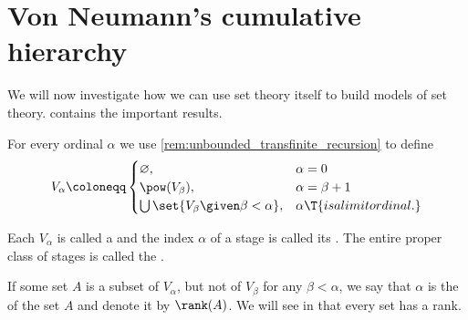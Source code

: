 \section{Von Neumann's cumulative hierarchy}\label{sec:von_neumanns_cumulative_hierarchy}

We will now investigate how we can use set theory itself to build models of set theory.  contains the important results.

\begin{definition}\label{def:cumulative_hierarchy}
  For every ordinal \( \alpha \) we use \cref{rem:unbounded_transfinite_recursion} to define
  \begin{equation}\label{eq:def:cumulative_hierarchy}
    V_\alpha \coloneqq \begin{cases}
      \varnothing,                                  &\alpha = 0 \\
      \pow(V_\beta),                                &\alpha = \beta + 1 \\
      \bigcup\set{ V_\beta \given \beta < \alpha }, &\alpha \T{is a limit ordinal.}
    \end{cases}
  \end{equation}

  Each \( V_\alpha \) is called a  and the index \( \alpha \) of a stage is called its . The entire proper class of stages is called the .

  If some set \( A \) is a subset of \( V_\alpha \), but not of \( V_\beta \) for any \( \beta < \alpha \), we say that \( \alpha \) is the  of the set \( A \) and denote it by \( \rank(A) \). We will see in  that every set has a rank.
\end{definition}

